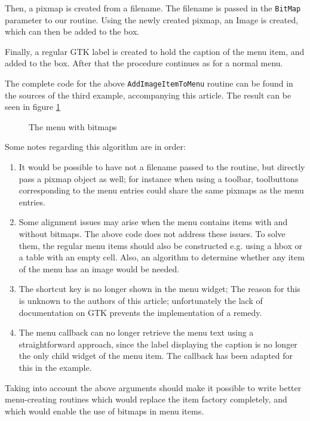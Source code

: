 \documentclass[10pt]{article}
\begin{document}
Then, a pixmap is created from a filename. The filename is passed in the 
\lstinline|BitMap| parameter to our routine. Using the newly created pixmap,
an Image is created, which can then be added to the box.

Finally, a regular GTK label is created to hold the caption of the menu
item, and added to the box. After that the procedure continues as for a
normal menu.

The complete code for the above \lstinline|AddImageItemToMenu| routine can
be found in the sources of the third example, accompanying this article.
The result can be seen in figure \ref{fig:pixmenu}
\begin{figure}[ht]
\caption{The menu with bitmaps}\label{fig:pixmenu}
\end{figure}

Some notes regarding this algorithm are in order:
\begin{enumerate}
\item It would be possible to have not a filename passed to the routine, but
directly pass a pixmap object as well; for instance when using a toolbar,
toolbuttons corresponding to the menu entries could share the same pixmaps
as the menu entries.
\item Some alignment issues may arise when the menu contains items with and
without bitmaps. The above code does not address these issues. To solve
them, the regular menu items should also be constructed e.g. using a hbox or a
table with an empty cell. Also, an algorithm to determine whether any item of
the menu has an image would be needed.
\item The shortcut key is no longer shown in the menu widget; The reason for
this is unknown to the authors of this article; unfortunately the lack of
documentation on GTK prevents the implementation of a remedy.
\item The menu callback can no longer retrieve the menu text using a
straightforward approach, since the label displaying the caption is 
no longer the only child widget of the menu item. The callback has been
adapted for this in the example.
\end{enumerate}
Taking into account the above arguments should make it possible to write
better menu-creating routines which would replace the item factory
completely, and which would enable the use of bitmaps in menu items.
\end{document}
